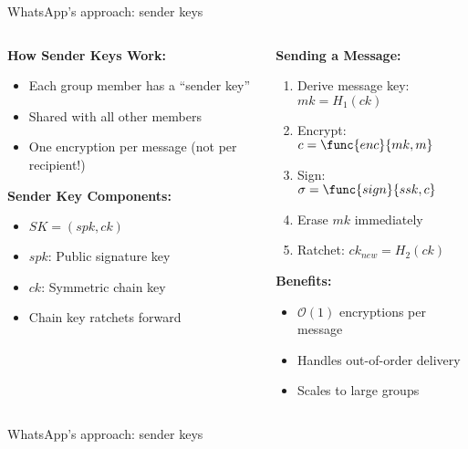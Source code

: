 \documentclass[aspectratio=169, lualatex, handout]{beamer}
\begin{document}
\begin{frame}{WhatsApp's approach: sender keys}
	\begin{columns}[c]
		\begin{column}{0.5\textwidth}
			\textbf{How Sender Keys Work:}
			\begin{itemize}
				\item Each group member has a ``sender key''
				\item Shared with all other members
				\item One encryption per message (not per recipient!)
			\end{itemize}
			\textbf{Sender Key Components:}
			\begin{itemize}
				\item $SK = (spk, ck)$
				\item $spk$: Public signature key
				\item $ck$: Symmetric chain key
				\item Chain key ratchets forward
			\end{itemize}
		\end{column}
		\begin{column}{0.5\textwidth}
			\textbf{Sending a Message:}
			\begin{enumerate}
				\item Derive message key: $mk = H_1(ck)$
				\item Encrypt: $c = \func{enc}{mk, m}$
				\item Sign: $\sigma = \func{sign}{ssk, c}$
				\item Erase $mk$ immediately
				\item Ratchet: $ck_{new} = H_2(ck)$
			\end{enumerate}
			\textbf{Benefits:}
			\begin{itemize}
				\item $\mathcal{O}(1)$ encryptions per message
				\item Handles out-of-order delivery
				\item Scales to large groups
			\end{itemize}
		\end{column}
	\end{columns}
\end{frame}

\begin{frame}{WhatsApp's approach: sender keys}
\end{frame}
\end{document}
